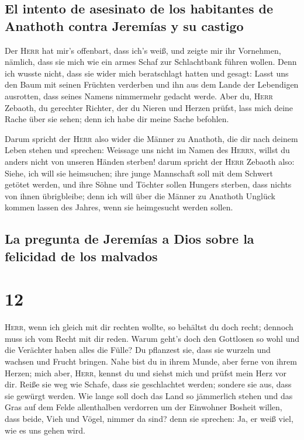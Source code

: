 \hypertarget{el-intento-de-asesinato-de-los-habitantes-de-anathoth-contra-jeremuxedas-y-su-castigo}{%
\subsection{El intento de asesinato de los habitantes de Anathoth contra
Jeremías y su
castigo}\label{el-intento-de-asesinato-de-los-habitantes-de-anathoth-contra-jeremuxedas-y-su-castigo}}

 Der \textsc{Herr} hat mir's offenbart, dass ich's weiß,
und zeigte mir ihr Vornehmen,  nämlich, dass sie mich wie
ein armes Schaf zur Schlachtbank führen wollen. Denn ich wusste nicht,
dass sie wider mich beratschlagt hatten und gesagt: Lasst uns den Baum
mit seinen Früchten verderben und ihn aus dem Lande der Lebendigen
ausrotten, dass seines Namens nimmermehr gedacht werde. 
Aber du, \textsc{Herr} Zebaoth, du gerechter Richter, der du Nieren und
Herzen prüfst, lass mich deine Rache über sie sehen; denn ich habe dir
meine Sache befohlen.

 Darum spricht der \textsc{Herr} also wider die Männer zu
Anathoth, die dir nach deinem Leben stehen und sprechen: Weissage uns
nicht im Namen des \textsc{Herrn}, willst du anders nicht von unseren
Händen sterben!  darum spricht der \textsc{Herr} Zebaoth
also: Siehe, ich will sie heimsuchen; ihre junge Mannschaft soll mit dem
Schwert getötet werden, und ihre Söhne und Töchter sollen Hungers
sterben, dass nichts von ihnen übrigbleibe;  denn ich
will über die Männer zu Anathoth Unglück kommen lassen des Jahres, wenn
sie heimgesucht werden sollen.

\hypertarget{la-pregunta-de-jeremuxedas-a-dios-sobre-la-felicidad-de-los-malvados}{%
\subsection{La pregunta de Jeremías a Dios sobre la felicidad de los
malvados}\label{la-pregunta-de-jeremuxedas-a-dios-sobre-la-felicidad-de-los-malvados}}

\hypertarget{section-11}{%
\section{12}\label{section-11}}

 \textsc{Herr}, wenn ich gleich mit dir rechten wollte, so
behältst du doch recht; dennoch muss ich vom Recht mit dir reden. Warum
geht's doch den Gottlosen so wohl und die Verächter haben alles die
Fülle?  Du pflanzest sie, dass sie wurzeln und wachsen und
Frucht bringen. Nahe bist du in ihrem Munde, aber ferne von ihrem
Herzen;  mich aber, \textsc{Herr}, kennst du und siehst
mich und prüfst mein Herz vor dir. Reiße sie weg wie Schafe, dass sie
geschlachtet werden; sondere sie aus, dass sie gewürgt werden.
 Wie lange soll doch das Land so jämmerlich stehen und das
Gras auf dem Felde allenthalben verdorren um der Einwohner Bosheit
willen, dass beide, Vieh und Vögel, nimmer da sind? denn sie sprechen:
Ja, er weiß viel, wie es uns gehen wird.

